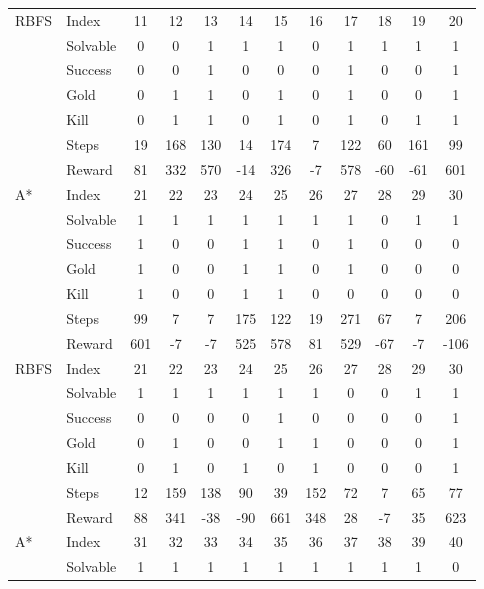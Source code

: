 \begin{table}[!h]
{\begin{tabular}{|l|l|c|c|c|c|c|c|c|c|c|c|}
		RBFS & Index & 11 & 12 & 13 & 14 & 15 & 16 & 17 & 18 & 19 & 20 \\ \cline{2-12}
		 & Solvable & 0 & 0 & 1 & 1 & 1 & 0 & 1 & 1 & 1 & 1 \\ \cline{2-12}
		 & Success & 0 & 0 & 1 & 0 & 0 & 0 & 1 & 0 & 0 & 1 \\ \cline{2-12}
		 & Gold & 0 & 1 & 1 & 0 & 1 & 0 & 1 & 0 & 0 & 1 \\ \cline{2-12}
		 & Kill & 0 & 1 & 1 & 0 & 1 & 0 & 1 & 0 & 1 & 1 \\ \cline{2-12}
		 & Steps & 19 & 168 & 130 & 14 & 174 & 7 & 122 & 60 & 161 & 99 \\ \cline{2-12}
		 & Reward & 81 & 332 & 570 & -14 & 326 & -7 & 578 & -60 & -61 & 601 \\ \cline{2-12}
		\hline
		\hline
		A* & Index & 21 & 22 & 23 & 24 & 25 & 26 & 27 & 28 & 29 & 30 \\ \cline{2-12}
		 & Solvable & 1 & 1 & 1 & 1 & 1 & 1 & 1 & 0 & 1 & 1 \\ \cline{2-12}
		 & Success & 1 & 0 & 0 & 1 & 1 & 0 & 1 & 0 & 0 & 0 \\ \cline{2-12}
		 & Gold & 1 & 0 & 0 & 1 & 1 & 0 & 1 & 0 & 0 & 0 \\ \cline{2-12}
		 & Kill & 1 & 0 & 0 & 1 & 1 & 0 & 0 & 0 & 0 & 0 \\ \cline{2-12}
		 & Steps & 99 & 7 & 7 & 175 & 122 & 19 & 271 & 67 & 7 & 206 \\ \cline{2-12}
		 & Reward & 601 & -7 & -7 & 525 & 578 & 81 & 529 & -67 & -7 & -106 \\ \cline{2-12}
		\hline
		RBFS & Index & 21 & 22 & 23 & 24 & 25 & 26 & 27 & 28 & 29 & 30 \\ \cline{2-12}
		 & Solvable & 1 & 1 & 1 & 1 & 1 & 1 & 0 & 0 & 1 & 1 \\ \cline{2-12}
		 & Success & 0 & 0 & 0 & 0 & 1 & 0 & 0 & 0 & 0 & 1 \\ \cline{2-12}
		 & Gold & 0 & 1 & 0 & 0 & 1 & 1 & 0 & 0 & 0 & 1 \\ \cline{2-12}
		 & Kill & 0 & 1 & 0 & 1 & 0 & 1 & 0 & 0 & 0 & 1 \\ \cline{2-12}
		 & Steps & 12 & 159 & 138 & 90 & 39 & 152 & 72 & 7 & 65 & 77 \\ \cline{2-12}
		 & Reward & 88 & 341 & -38 & -90 & 661 & 348 & 28 & -7 & 35 & 623 \\ \cline{2-12}
		\hline
		\hline
		A* & Index & 31 & 32 & 33 & 34 & 35 & 36 & 37 & 38 & 39 & 40 \\ \cline{2-12}
		 & Solvable & 1 & 1 & 1 & 1 & 1 & 1 & 1 & 1 & 1 & 0 \\ \cline{2-12}

\end{tabular}}
\end{table}
